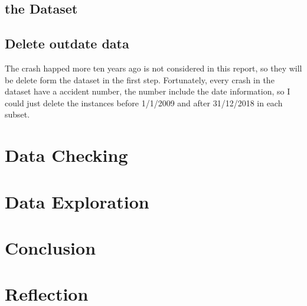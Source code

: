 \documentclass[11pt]{article}
\theoremstyle{definition}
\begin{document}
\subsection{the Dataset}

\subsection{Delete outdate data}
The crash happed more ten years ago is not considered in this report, so they will be delete form the dataset in the first step. Fortunately, every crash in the dataset have a accident number, the number include the date information, so I could just delete the instances before 1/1/2009 and after 31/12/2018 in each subset.  


\section{Data Checking}
\label{dataChecking}

\section{Data Exploration}
\label{dataExploration}


\section{Conclusion}

\section{Reflection}
\end{document}
